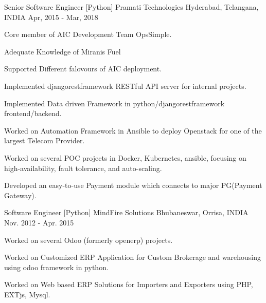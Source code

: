 \begin{cventries}
  \cventry
    {Senior Software Engineer [Python]} %
    {Pramati Technologies} %
    {Hyderabad, Telangana, INDIA} %
    {Apr, 2015 - Mar, 2018} %
    {
      \begin{cvitems} %
        \item {Core member of AIC Development Team OpsSimple.}
        \item {Adequate Knowledge of Miranis Fuel}
        \item {Supported Different falovours of AIC deployment.}
        \item {Implemented djangorestframework RESTful API server for internal projects.}
        \item {Implemented Data driven Framework in python/djangorestframework frontend/backend. }
        \item {Worked on Automation Framework in Ansible to deploy Openstack for one of the largest Telecom Provider. }
        \item {Worked on several POC projects in Docker, Kubernetes, ansible, focusing on high-availability, fault tolerance, and auto-scaling. }
        \item {Developed an easy-to-use Payment module which connects to major PG(Payment Gateway).}
      \end{cvitems}
    }

  \cventry
    {Software Engineer [Python]} %
    {MindFire Solutions} %
    {Bhubaneswar, Orrisa, INDIA} %
    {Nov. 2012 - Apr. 2015} %
    {
      \begin{cvitems} %
        \item {Worked on several Odoo (formerly openerp) projects.}
        \item {Worked on Customized ERP Application for Custom Brokerage and warehousing using odoo framework in python.}
        \item {Worked on Web based ERP Solutions for Importers and Exporters using PHP, EXTjs, Mysql.}
      \end{cvitems}
    }


\end{cventries}
